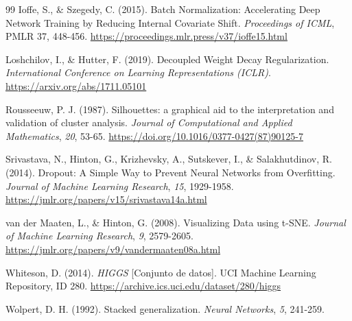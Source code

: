 \documentclass[12pt,a4paper]{article}
\begin{document}
\begin{thebibliography}{99}
Ioffe, S., \& Szegedy, C. (2015). Batch Normalization: Accelerating Deep Network Training by
Reducing Internal Covariate Shift. \emph{Proceedings of ICML}, PMLR 37, 448-456.
\url{https://proceedings.mlr.press/v37/ioffe15.html}

Loshchilov, I., \& Hutter, F. (2019). Decoupled Weight Decay Regularization. \emph{International
Conference on Learning Representations (ICLR)}. \url{https://arxiv.org/abs/1711.05101}

Rousseeuw, P. J. (1987). Silhouettes: a graphical aid to the interpretation and validation of
cluster analysis. \emph{Journal of Computational and Applied Mathematics}, \emph{20}, 53-65.
\url{https://doi.org/10.1016/0377-0427(87)90125-7}

Srivastava, N., Hinton, G., Krizhevsky, A., Sutskever, I., \& Salakhutdinov, R. (2014). Dropout: A
Simple Way to Prevent Neural Networks from Overfitting. \emph{Journal of Machine Learning
Research}, \emph{15}, 1929-1958. \url{https://jmlr.org/papers/v15/srivastava14a.html}

van der Maaten, L., \& Hinton, G. (2008). Visualizing Data using t-SNE. \emph{Journal of Machine
Learning Research}, \emph{9}, 2579-2605. \url{https://jmlr.org/papers/v9/vandermaaten08a.html}

Whiteson, D. (2014). \emph{HIGGS} [Conjunto de datos]. UCI Machine Learning Repository, ID 280.
\url{https://archive.ics.uci.edu/dataset/280/higgs}

Wolpert, D. H. (1992). Stacked generalization. \emph{Neural Networks}, \emph{5}, 241-259.

\end{thebibliography}
\end{document}
